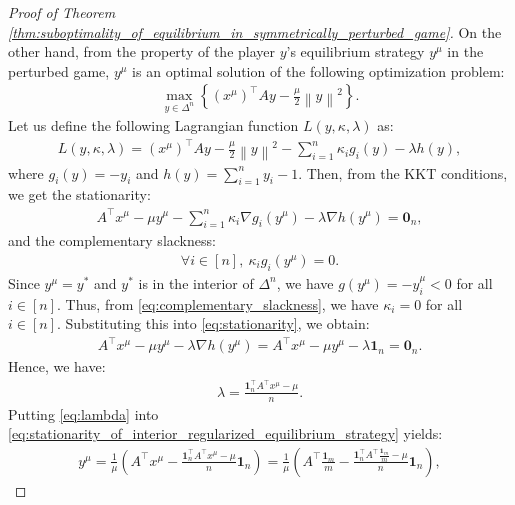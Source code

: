 \documentclass[10pt,a4paper]{amsart}
\newcommand{\bone}{\mathbf{1}}
\newcommand{\bzero}{\mathbf{0}}
\begin{document}
\begin{proof}[Proof of Theorem \ref{thm:suboptimality_of_equilibrium_in_symmetrically_perturbed_game}]
    On the other hand, from the property of the player $y$'s equilibrium strategy $y^{\mu}$ in the perturbed game, $y^{\mu}$ is an optimal solution of the following optimization problem:
    \begin{align*}
        \max_{y\in \Delta^n}\left\{(x^{\mu})^{\top}Ay - \frac{\mu}{2}\left\|y\right\|^2\right\}.
    \end{align*}
    Let us define the following Lagrangian function $L(y, \kappa, \lambda)$ as:
    \begin{align*}
        L(y, \kappa, \lambda) = (x^{\mu})^{\top}Ay - \frac{\mu}{2}\left\|y\right\|^2 - \sum_{i=1}^n \kappa_ig_i(y) - \lambda h(y),
    \end{align*}
    where $g_i(y) = -y_i$ and $h(y) = \sum_{i=1}^ny_i - 1$.
    Then, from the KKT conditions, we get the stationarity:
    \begin{align}
        A^{\top}x^{\mu} - \mu y^{\mu} - \sum_{i=1}^n \kappa_i \nabla g_i(y^{\mu}) - \lambda \nabla h(y^{\mu}) = \bzero_n,
        \label{eq:stationarity}
    \end{align}
    and the complementary slackness:
    \begin{align}
        \forall i\in [n], ~\kappa_i g_i(y^{\mu}) = 0.
        \label{eq:complementary_slackness}
    \end{align}
    Since $y^{\mu} = y^{\ast}$ and $y^{\ast}$ is in the interior of $\Delta^n$, we have $g(y^{\mu}) = -y_i^{\mu} < 0$ for all $i\in [n]$.
    Thus, from \eqref{eq:complementary_slackness}, we have $\kappa_i = 0$ for all $i\in [n]$.
    Substituting this into \eqref{eq:stationarity}, we obtain:
    \begin{align}
        A^{\top}x^{\mu} - \mu y^{\mu} - \lambda \nabla h(y^{\mu}) = A^{\top}x^{\mu} - \mu y^{\mu} - \lambda \bone_n = \bzero_n.
        \label{eq:stationarity_of_interior_regularized_equilibrium_strategy}
    \end{align}
    Hence, we have:
    \begin{align}
        \lambda = \frac{\bone_n^{\top}A^{\top}x^{\mu} - \mu}{n}.
        \label{eq:lambda}
    \end{align}
    Putting \eqref{eq:lambda} into \eqref{eq:stationarity_of_interior_regularized_equilibrium_strategy} yields:
    \begin{align*}
        y^{\mu} = \frac{1}{\mu}\left(A^{\top}x^{\mu} - \frac{\bone_n^{\top}A^{\top}x^{\mu} - \mu}{n}\bone_n\right) = \frac{1}{\mu}\left(A^{\top}\frac{\bone_m}{m} - \frac{\bone_n^{\top}A^{\top}\frac{\bone_m}{m} - \mu}{n}\bone_n\right),

\end{align*}
\end{proof}
\end{document}
